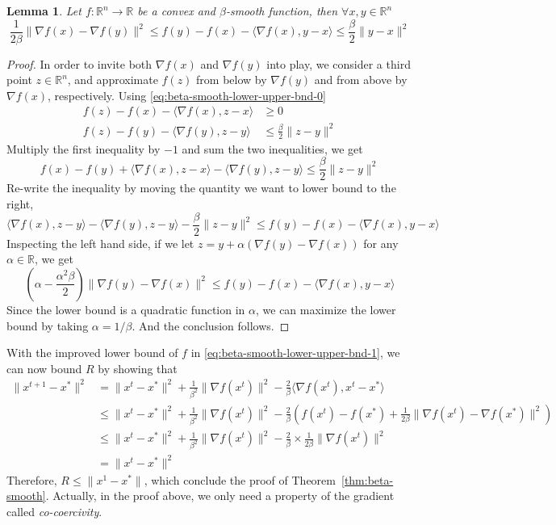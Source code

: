 \documentclass{scrartcl}
\newtheorem{lemma}{Lemma}
\newcommand{\RR}{\mathbb{R}}
\begin{document}
\begin{lemma}
  Let $f:\RR^n\rightarrow\RR$ be a convex and $\beta$-smooth function, then $\forall x,y\in\RR^n$
  \begin{equation}
  \frac{1}{2\beta}\|\nabla f(x)-\nabla f(y)\|^2
  \leq f(y) - f(x) - \langle \nabla f(x), y-x\rangle
  \leq \frac {\beta} {2}\|y-x\|^2
  \label{eq:beta-smooth-lower-upper-bnd-1}
  \end{equation}
\end{lemma}
\begin{proof}
  In order to invite both $\nabla f(x)$ and $\nabla f(y)$ into play, we consider a third point
  $z\in\RR^n$, and approximate $f(z)$ from below by $\nabla f(y)$ and from above by $\nabla f(x)$,
  respectively. Using \eqref{eq:beta-smooth-lower-upper-bnd-0}
  \[
  \begin{aligned}
    f(z) - f(x) - \langle \nabla f(x), z-x\rangle &\geq 0\\
    f(z) - f(y) - \langle \nabla f(y), z-y\rangle &\leq \frac{\beta}{2}\|z-y\|^2
  \end{aligned}
  \]
  Multiply the first inequality by $-1$ and sum the two inequalities, we get
  \[
  f(x)-f(y)+\langle \nabla f(x), z-x\rangle - \langle \nabla f(y),z-y\rangle \leq \frac{\beta}
  {2}\|z-y\|^2
  \]
  Re-write the inequality by moving the quantity we want to lower bound to the right,
  \[
   \langle \nabla f(x), z-y\rangle - \langle \nabla f(y),z-y\rangle - \frac{\beta}{2}\|z-y\|^2\leq f
   (y)-f (x)-\langle \nabla f (x),y-x\rangle
  \]
  Inspecting the left hand side, if we let $z=y+\alpha (\nabla f(y)-\nabla f(x))$ for any
  $\alpha\in\RR$, we get
  \[
  \left(\alpha - \frac{\alpha^2\beta}{2}\right)\|\nabla f(y)-\nabla f(x)\|^2\leq f (y)-f (x)-\langle
  \nabla f
  (x),y-x\rangle
  \]
  Since the lower bound is a quadratic function in $\alpha$, we can maximize the lower bound by
  taking $\alpha = 1/\beta$. And the conclusion follows.
\end{proof}

With the improved lower bound of $f$ in \eqref{eq:beta-smooth-lower-upper-bnd-1}, we can now bound
$R$ by showing that
\[
  \begin{aligned}
    \|x^{t+1}-x^*\|^2
    &=\|x^t-x^*\|^2 + \frac{1}{\beta^2}\|\nabla f(x^t)\|^2 - \frac{2}{\beta}\langle \nabla f(x^t),
    x^t-x^*\rangle \\
    &\leq \|x^t-x^*\|^2 + \frac{1}{\beta^2}\|\nabla f(x^t)\|^2
    - \frac{2}{\beta}\left(f(x^t)-f(x^*) + \frac{1}{2\beta}\|\nabla f(x^t)-\nabla f(x^*)\|^2\right)
    \\
    &\leq \|x^t-x^*\|^2 + \frac{1}{\beta^2}\|\nabla f(x^t)\|^2 - \frac{2}{\beta}\times \frac{1}
    {2\beta}\|\nabla f(x^t)\|^2 \\
    & = \|x^t-x^*\|^2
  \end{aligned}
\]
Therefore, $R\leq \|x^1-x^*\|$, which conclude the proof of Theorem~\ref{thm:beta-smooth}.
Actually, in the proof above, we only need a property of the gradient called \emph{co-coercivity}.
\end{document}
